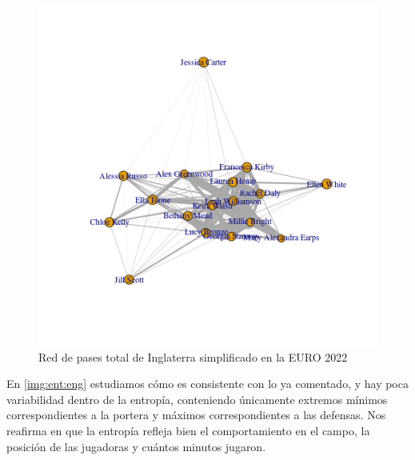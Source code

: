 \begin{figure}[ht!]
  \centering
   \includegraphics[width=\textwidth]{./img/plot_england_simpl.png}
   \caption{Red de pases total de Inglaterra simplificado en la EURO 2022}
   \label{img:red:simpl:eng}
\end{figure}

En \ref{img:ent:eng} estudiamos cómo es consistente con lo ya comentado, y hay poca variabilidad dentro de la 
entropía, conteniendo únicamente extremos mínimos correspondientes a la portera y máximos correspondientes a las defensas. 
Nos reafirma en que la entropía refleja bien el comportamiento en el campo, la posición de las jugadoras y cuántos 
minutos jugaron.


